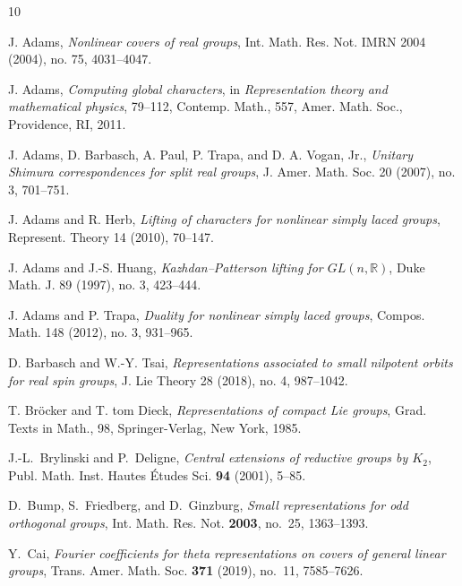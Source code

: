 \documentclass{amsart}
\newcommand{\bbR}{{\mathbb R}}
\theoremstyle{definition}
\begin{document}
%
\begin{thebibliography}{10}




J. Adams,
\emph{Nonlinear covers of real groups},
Int. Math. Res. Not. IMRN 2004 (2004), no. 75, 4031--4047.

J. Adams,
\emph{Computing global characters},
in \emph{Representation theory and mathematical physics},
79--112, Contemp. Math., 557,
Amer. Math. Soc., Providence, RI, 2011.

J. Adams, D. Barbasch, A. Paul, P. Trapa, and D. A. Vogan, Jr.,
\emph{Unitary Shimura correspondences for split real groups},
J. Amer. Math. Soc. 20 (2007), no. 3, 701--751.

J. Adams and R. Herb,
\emph{Lifting of characters for nonlinear simply laced groups},
Represent. Theory 14 (2010), 70--147.

J. Adams and J.-S. Huang,
\emph{Kazhdan--Patterson lifting for \(GL(n,\bbR)\)},
Duke Math. J. 89 (1997), no. 3, 423--444.

J. Adams and P. Trapa,
\emph{Duality for nonlinear simply laced groups},
Compos. Math. 148 (2012), no. 3, 931--965.

D. Barbasch and W.-Y. Tsai,
\emph{Representations associated to small nilpotent orbits for real spin groups},
J. Lie Theory 28 (2018), no. 4, 987--1042.

T. Br\"ocker and T. tom Dieck,
\emph{Representations of compact Lie groups},
Grad. Texts in Math., 98,
Springer-Verlag, New York, 1985.


J.-L.~Brylinski and P.~Deligne,
\emph{Central extensions of reductive groups by \(K_2\)},
Publ. Math. Inst. Hautes \'Etudes Sci. \textbf{94} (2001), 5--85.






D.~Bump, S.~Friedberg, and D.~Ginzburg,
\emph{Small representations for odd orthogonal groups},
Int. Math. Res. Not. \textbf{2003}, no.~25, 1363--1393.


Y.~Cai,
\emph{Fourier coefficients for theta representations on covers of
general linear groups},
Trans. Amer. Math. Soc. \textbf{371} (2019), no.~11, 7585--7626.





\end{thebibliography}
\end{document}
